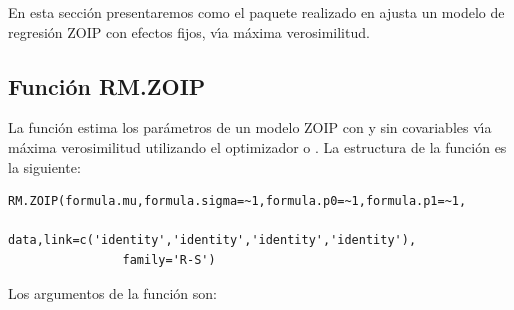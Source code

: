 En esta secci\'{o}n presentaremos como el paquete  realizado en  ajusta un modelo de regresi\'{o}n ZOIP con efectos fijos, v\'{\i}a m\'{a}xima verosimilitud.

%
%

\subsection{Funci\'{o}n RM.ZOIP}

La funci\'{o}n  estima los par\'{a}metros de un modelo ZOIP con y sin covariables v\'{\i}a m\'{a}xima verosimilitud utilizando el optimizador  o . La estructura de la funci\'{o}n  es la siguiente:

\begin{verbatim}
RM.ZOIP(formula.mu,formula.sigma=~1,formula.p0=~1,formula.p1=~1,
				data,link=c('identity','identity','identity','identity'),
				family='R-S')
\end{verbatim}

Los argumentos de la funci\'{o}n  son:

